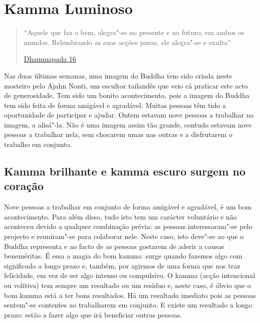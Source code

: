 
\chapter{Kamma Luminoso}


\begin{quote}

``Aquele que faz o bem, alegra"-se no presente e no futuro, em ambos os mundos. Relembrando as suas acções puras, ele alegra"-se e exulta''

\href{https://suttacentral.net/dhp1"-20/en/buddharakkhita}{Dhammapada 16}

\end{quote}

Nas duas últimas semanas, uma imagem do Buddha tem sido criada neste mosteiro
pelo Ajahn Nonti, um escultor tailandês que veio cá praticar este acto de
generosidade. Tem sido um bonito acontecimento, pois a imagem do Buddha tem sido
feita de forma amigável e agradável. Muitas pessoas têm tido a oportunidade de
participar e ajudar. Ontem estavam nove pessoas a trabalhar na imagem, a
alisá"-la. Não é uma imagem assim tão grande, contudo estavam nove pessoas a
trabalhar nela, sem chocarem umas nas outras e a disfrutarem o trabalho em
conjunto.

\section{Kamma brilhante e kamma escuro surgem no coração}

Nove pessoas a trabalhar em conjunto de forma amigável e agradável, é um bom
acontecimento. Para além disso, tudo isto tem um carácter voluntário e não
aconteceu devido a qualquer combinação prévia: as pessoas interessaram"-se pelo
projecto e reuniram"-se para colaborar nele. Neste caso, isto deve"-se ao que o
Buddha representa e ao facto de as pessoas gostarem de aderir a causas
beneméritas. É essa a magia do bom kamma: surge quando fazemos algo com
significado a longo prazo e, também, por agirmos de uma forma que nos traz
felicidade, em vez de ser algo intenso ou compulsivo. O kamma (acção intencional
ou volitiva) tem sempre um resultado ou um resíduo e, neste caso, é óbvio que o
bom kamma está a ter bons resultados. Há um resultado imediato pois as pessoas
sentem"-se contentes ao trabalharem em conjunto. E existe um resultado a longo
prazo: estão a fazer algo que irá beneficiar outras pessoas.

